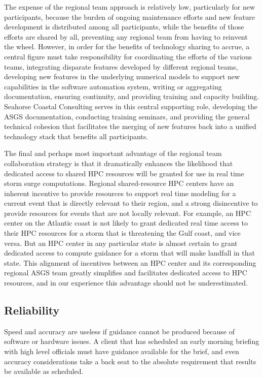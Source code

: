 \documentclass[jmse,article,submit,moreauthors,pdftex,12pt,a4paper]{mdpi}
\begin{document}
The expense of the regional team approach is relatively low, 
particularly for new participants, because the burden of ongoing 
maintenance efforts and new feature development is distributed among 
all participants, while the benefits of those efforts are shared by 
all, preventing any regional team from having to reinvent the wheel. 
However, in order for the benefits of technology sharing to accrue, 
a central figure must take responsibility for coordinating the 
efforts of the various teams, integrating disparate features 
developed by different regional teams, developing new features in 
the underlying numerical models to support new capabilities in the 
software automation system, writing or aggregating documentation, 
ensuring continuity, and providing training and capacity building. 
Seahorse Coastal Consulting serves in this central supporting role, 
developing the ASGS documentation, conducting training seminars, and 
providing the general technical cohesion that facilitates the 
merging of new features back into a unified technology stack that 
benefits all participants. 

The final and perhaps most important advantage of the regional team 
collaboration strategy is that it dramatically enhances the 
likelihood that dedicated access to shared HPC resources will be 
granted for use in real time storm surge computations. Regional 
shared-resource HPC centers have an inherent incentive to provide 
resources to support real time modeling for a current event that is 
directly relevant to their region, and a strong disincentive to 
provide resources for events that are not locally relevant. For 
example, an HPC center on the Atlantic coast is not likely to grant 
dedicated real time access to their HPC resources for a storm that 
is threatening the Gulf coast, and vice versa. But an HPC center in 
any particular state is almost certain to grant dedicated access to 
compute guidance for a storm that will make landfall in that state. 
This alignment of incentives between an HPC center and its 
corresponding regional ASGS team greatly simplifies and facilitates 
dedicated access to HPC resources, and in our experience this 
advantage should not be underestimated. 

\subsection{Reliability}

Speed and accuracy are useless if guidance cannot be produced 
because of software or hardware issues. A client that has scheduled 
an early morning briefing with high level officials must have 
guidance available for the brief, and even accuracy considerations 
take a back seat to the absolute requirement that results be 
available as scheduled. 
\end{document}
